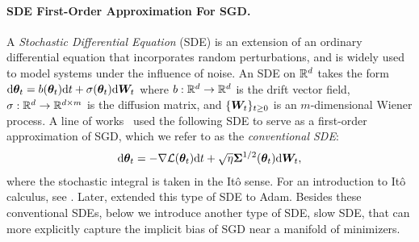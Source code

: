 \paragraph{SDE First-Order Approximation For SGD.} A \textit{Stochastic Differential Equation} (SDE) is an extension of an ordinary differential equation that incorporates random perturbations, and is widely used to model systems under the influence of noise. An SDE on $\mathbb{R}^d$ takes the form $\mathrm{d}{\bm{\theta}}_t=b({\bm{\theta}}_t)\mathrm{d}t +\sigma({\bm{\theta}}_t)\mathrm{d}{\bm{W}}_t$
where $b:\mathbb{R}^d\to\mathbb{R}^d$ is the drift vector field, $\sigma:\mathbb{R}^d\to\mathbb{R}^{d\times m}$ is the diffusion matrix, and $\{{\bm{W}}_t\}_{t \ge 0}$ is an $m$-dimensional Wiener process. 
A line of works~\citep{li2015dynamics, jastrzkebski2017three,li2017stochastic, smith2020generalization,li2019stochastic,li2021validitymodelingsgdstochastic} used the following SDE to serve as a first-order approximation of SGD, which we refer to as the \textit{conventional SDE}:
\begin{align*}
    \mathrm{d}{\bm{\theta}}_t = -\nabla \mathcal{L}({\bm{\theta}}_t)\mathrm{d}t + \sqrt{\eta}{\bm{\Sigma}}^{1/2}({\bm{\theta}}_t)\mathrm{d}{\bm{W}}_t,
\end{align*}
where the stochastic integral is taken in the Itô sense.
For an introduction to Itô calculus, see \citet{oksendal2013stochastic}. 
Later, \citet{malladi2024sdesscalingrulesadaptive} extended this type of SDE to Adam.
Besides these conventional SDEs, below we introduce another type of SDE, slow SDE, that can more explicitly capture the implicit bias of SGD near a manifold of minimizers.






